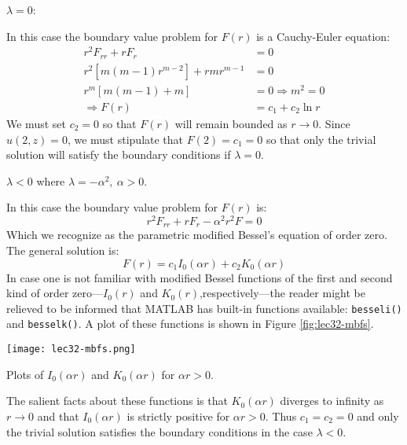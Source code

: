 \vspace{0.15cm}

\noindent\underline{$\lambda = 0$}:

\vspace{0.05cm}

\noindent In this case the boundary value problem for $F(r)$ is a Cauchy-Euler equation:
\begin{align*}
r^2F_{rr} + rF_r &= 0 \\
r^2[m(m-1)r^{m-2}] + rmr^{m-1} &= 0 \\
r^m[m(m-1) + m] &= 0 \Rightarrow m^2 = 0\\
\Rightarrow F(r) &= c_1 + c_2 \ln r
\end{align*}
We must set $c_2=0$ so that $F(r)$ will remain bounded as $r \to 0$.  Since $u(2,z)=0$, we must stipulate that $F(2)=c_1=0$ so that only the trivial solution will satisfy the boundary conditions if $\lambda = 0$.

\vspace{0.05cm}

\noindent\underline{$\lambda < 0$} where $\lambda = -\alpha^2, \ \alpha>0$.

\noindent In this case the boundary value problem for $F(r)$ is:
\begin{equation*}
r^2F_{rr} + rF_r -\alpha^2r^2F = 0
\end{equation*} 
Which we recognize as the parametric modified Bessel's equation of order zero.  The general solution is:
\begin{equation*}
F(r) = c_1I_0(\alpha r) + c_2 K_0(\alpha r)
\end{equation*}
In case one is not familiar with modified Bessel functions of the first and second kind of order zero---$I_0(r)$ and $K_0(r)$,respectively---the reader might be relieved to be informed that MATLAB has built-in functions available: \lstinline[style=myMatlab]{besseli()} and \lstinline[style=myMatlab]{besselk()}. A plot of these functions is shown in Figure \ref{fig:lec32-mbfs}.
\begin{marginfigure}
\texttt{[image: lec32-mbfs.png]}
\caption{Plots of $I_0(\alpha r)$ and $K_0(\alpha r)$ for $\alpha r > 0$.}
\label{fig:lec32-mbfs}
\end{marginfigure}
The salient facts about these functions is that $K_0(\alpha r)$ diverges to infinity as $r \to 0$ and that $I_0(\alpha r)$ is strictly positive for $\alpha r > 0$.  Thus $c_1 = c_2 = 0$ and only the trivial solution satisfies the boundary conditions in the case $\lambda < 0 $.

